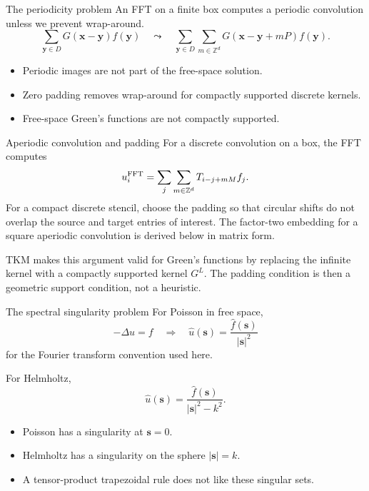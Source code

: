 \documentclass[aspectratio=169,11pt]{beamer}
\newcommand{\x}{\bm{x}}
\newcommand{\y}{\bm{y}}
\newcommand{\s}{\bm{s}}
\begin{document}
\begin{frame}{The periodicity problem}
\small
An FFT on a finite box computes a periodic convolution unless we prevent wrap-around.
\[
  \sum_{\y\in D}G(\x-\y)f(\y)
  \quad\leadsto\quad
  \sum_{\y\in D}\sum_{m\in\mathbb{Z}^d}
  G(\x-\y+mP)f(\y).
\]

\begin{itemize}
  \item Periodic images are not part of the free-space solution.
  \item Zero padding removes wrap-around for compactly supported discrete kernels.
  \item Free-space Green's functions are not compactly supported.
\end{itemize}
\end{frame}

\begin{frame}{Aperiodic convolution and padding}
\small
For a discrete convolution on a box, the FFT computes
\[
  u_i^{\rm FFT}
  =
  \sum_j \sum_{m\in\mathbb Z^d}
  T_{i-j+mM} f_j .
\]
For a compact discrete stencil, choose the padding so that circular shifts do
not overlap the source and target entries of interest. The factor-two embedding
for a square aperiodic convolution is derived below in matrix form.

\vspace{1mm}
TKM makes this argument valid for Green's functions by replacing the infinite
kernel with a compactly supported kernel $G^L$.  The padding condition is then
a geometric support condition, not a heuristic.
\end{frame}

\begin{frame}{The spectral singularity problem}
\small
For Poisson in free space,
\[
  -\Delta u=f
  \quad\Longrightarrow\quad
  \widehat{u}(\s)=\frac{\widehat{f}(\s)}{|\s|^2}
\]
for the Fourier transform convention used here.

\vspace{2mm}
For Helmholtz,
\[
  \widehat{u}(\s)=\frac{\widehat{f}(\s)}{|\s|^2-k^2}.
\]

\begin{itemize}
  \item Poisson has a singularity at $\s=0$.
  \item Helmholtz has a singularity on the sphere $|\s|=k$.
  \item A tensor-product trapezoidal rule does not like these singular sets.
\end{itemize}
\end{frame}
\end{document}

